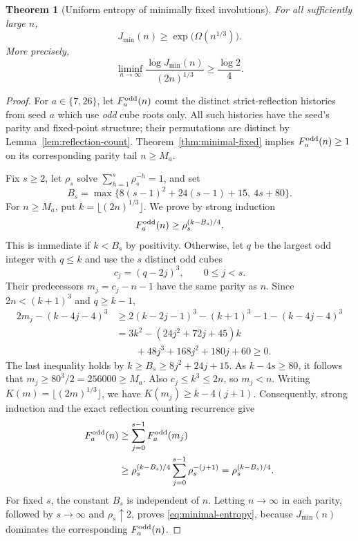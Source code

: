 \documentclass[10pt]{article}
\newtheorem{theorem}{Theorem}
\begin{document}
\begin{theorem}[Uniform entropy of minimally fixed involutions]
\label{thm:minimal-entropy}
For all sufficiently large $n$,
\[
\boxed{J_{\min}(n)\ge
\exp\bigl(\Omega(n^{1/3})\bigr).}
\]
More precisely,
\begin{equation}\label{eq:minimal-entropy}
\boxed{\displaystyle
\liminf_{n\to\infty}
\frac{\log J_{\min}(n)}{(2n)^{1/3}}
\ge\frac{\log2}{4}.}
\end{equation}
\end{theorem}
\begin{proof}
For $a\in\{7,26\}$, let
$F_a^{\rm odd}(n)$ count the
distinct strict-reflection
histories from seed $a$ which
use \emph{odd} cube roots only.
All such histories have the
seed's parity and fixed-point
structure; their permutations
are distinct by
Lemma~\ref{lem:reflection-count}.
Theorem~\ref{thm:minimal-fixed}
implies $F_a^{\rm odd}(n)\ge1$
on its corresponding parity
tail $n\ge M_a$.

Fix $s\ge2$, let $\rho_s$
solve
$\sum_{h=1}^{s}\rho_s^{-h}=1$,
and set
\[
B_s=
\max\{8(s-1)^2+24(s-1)+15,\ 4s+80\}.
\]
For $n\ge M_a$, put
$k=\lfloor(2n)^{1/3}\rfloor$.
We prove by strong induction
\[
F_a^{\rm odd}(n)
\ge\rho_s^{(k-B_s)/4}.
\]
This is immediate if $k<B_s$
by positivity. Otherwise,
let $q$ be the largest odd
integer with $q\le k$ and
use the $s$ distinct odd cubes
\[
c_j=(q-2j)^3,\qquad 0\le j<s.
\]
Their predecessors
$m_j=c_j-n-1$ have the same
parity as $n$. Since
$2n<(k+1)^3$ and
$q\ge k-1$,
\[
\begin{aligned}
2m_j-(k-4j-4)^3
&\ge 2(k-2j-1)^3
 -(k+1)^3-1
 -(k-4j-4)^3\\
&=3k^2-(24j^2+72j+45)k\\
&\qquad+
48j^3+168j^2+180j+60
\ge0.
\end{aligned}
\]
The last inequality holds by
$k\ge B_s\ge8j^2+24j+15$.
As $k-4s\ge80$, it follows
that $m_j\ge80^3/2
=256000\ge M_a$.
Also $c_j\le k^3\le2n$,
so $m_j<n$.
Writing $K(m)=\lfloor(2m)^{1/3}\rfloor$,
we have
$K(m_j)\ge k-4(j+1)$.
Consequently, strong induction
and the exact reflection
counting recurrence give
\[
\begin{aligned}
F_a^{\rm odd}(n)
&\ge\sum_{j=0}^{s-1}F_a^{\rm odd}(m_j)\\
&\ge\rho_s^{(k-B_s)/4}
\sum_{j=0}^{s-1}\rho_s^{-(j+1)}
=\rho_s^{(k-B_s)/4}.
\end{aligned}
\]
For fixed $s$, the constant
$B_s$ is independent of $n$.
Letting $n\to\infty$ in
each parity, followed by
$s\to\infty$ and
$\rho_s\uparrow2$, proves
\eqref{eq:minimal-entropy},
because $J_{\min}(n)$ dominates
the corresponding $F_a^{\rm odd}(n)$.
\end{proof}
\end{document}
